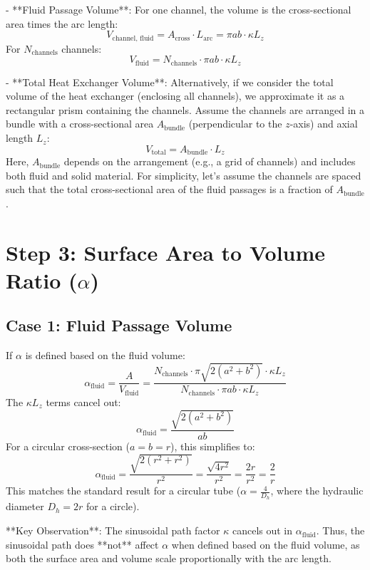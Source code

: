 \documentclass[]{article}
\begin{document}
- **Fluid Passage Volume**: For one channel, the volume is the cross-sectional area times the arc length:
\[
V_{\text{channel, fluid}} = A_{\text{cross}} \cdot L_{\text{arc}} = \pi a b \cdot \kappa L_z
\]
For \(N_{\text{channels}}\) channels:
\[
V_{\text{fluid}} = N_{\text{channels}} \cdot \pi a b \cdot \kappa L_z
\]

- **Total Heat Exchanger Volume**: Alternatively, if we consider the total volume of the heat exchanger (enclosing all channels), we approximate it as a rectangular prism containing the channels. Assume the channels are arranged in a bundle with a cross-sectional area \(A_{\text{bundle}}\) (perpendicular to the \(z\)-axis) and axial length \(L_z\):
\[
V_{\text{total}} = A_{\text{bundle}} \cdot L_z
\]
Here, \(A_{\text{bundle}}\) depends on the arrangement (e.g., a grid of channels) and includes both fluid and solid material. For simplicity, let’s assume the channels are spaced such that the total cross-sectional area of the fluid passages is a fraction of \(A_{\text{bundle}}\).

\section{Step 3: Surface Area to Volume Ratio (\(\alpha\))}
\subsection{Case 1: Fluid Passage Volume}
If \(\alpha\) is defined based on the fluid volume:
\[
\alpha_{\text{fluid}} = \frac{A}{V_{\text{fluid}}} = \frac{N_{\text{channels}} \cdot \pi \sqrt{2(a^2 + b^2)} \cdot \kappa L_z}{N_{\text{channels}} \cdot \pi a b \cdot \kappa L_z}
\]
The \(\kappa L_z\) terms cancel out:
\[
\alpha_{\text{fluid}} = \frac{\sqrt{2(a^2 + b^2)}}{a b}
\]
For a circular cross-section (\(a = b = r\)), this simplifies to:
\[
\alpha_{\text{fluid}} = \frac{\sqrt{2(r^2 + r^2)}}{r^2} = \frac{\sqrt{4 r^2}}{r^2} = \frac{2r}{r^2} = \frac{2}{r}
\]
This matches the standard result for a circular tube (\(\alpha = \frac{4}{D_h}\), where the hydraulic diameter \(D_h = 2r\) for a circle).

**Key Observation**: The sinusoidal path factor \(\kappa\) cancels out in \(\alpha_{\text{fluid}}\). Thus, the sinusoidal path does **not** affect \(\alpha\) when defined based on the fluid volume, as both the surface area and volume scale proportionally with the arc length.
\end{document}
